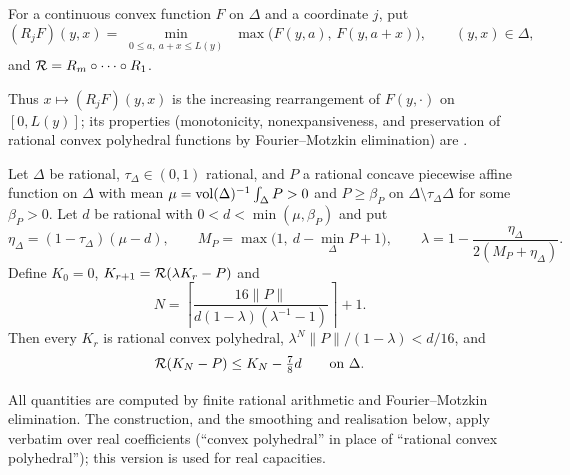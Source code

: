 \begin{definition}\label{def:cmp-rearrangement}
For a continuous convex function $F$ on $\Delta$ and a coordinate $j$, put
\[
 (R_jF)(y,x)=\min_{\substack{0\le a,\ a+x\le L(y)}}\ \max\bigl(F(y,a),\,F(y,a+x)\bigr),
 \qquad (y,x)\in\Delta,
\]
and $\mathcal{R}=R_m\circ\dots\circ R_1$.
\end{definition}

Thus $x\mapsto(R_jF)(y,x)$ is the increasing rearrangement of $F(y,\cdot)$ on $[0,L(y)]$; its properties
(monotonicity, nonexpansiveness, and preservation of rational convex polyhedral functions by Fourier--Motzkin
elimination) are .

\begin{proposition}\label{prop:cmp-fixed-point}
Let $\Delta$ be rational, $\tau_\Delta\in(0,1)$ rational, and $P$ a rational concave piecewise affine function on
$\Delta$ with mean $\mu=\operatorname{vol}(\Delta)^{-1}\int_\Delta P>0$ and $P\ge\beta_P$ on $\Delta\setminus\tau_\Delta\Delta$ for some
$\beta_P>0$. Let $d$ be rational with $0<d<\min(\mu,\beta_P)$ and put
\[
 \eta_\Delta=(1-\tau_\Delta)(\mu-d),\qquad M_P=\max\bigl(1,\ d-\min_\Delta P+1\bigr),\qquad
 \lambda=1-\frac{\eta_\Delta}{2(M_P+\eta_\Delta)}.
\]
Define $K_0=0$, $K_{r+1}=\mathcal{R}(\lambda K_r-P)$ and
\[
 N=\left\lceil\frac{16\|P\|}{d(1-\lambda)(\lambda^{-1}-1)}\right\rceil+1.
\]
Then every $K_r$ is rational convex polyhedral, $\lambda^N\|P\|/(1-\lambda)<d/16$, and
\[
 \mathcal{R}(K_N-P)\le K_N-\tfrac78d\qquad\text{on }\Delta .
\]
\end{proposition}

All quantities are computed by finite rational arithmetic and Fourier--Motzkin elimination. The construction, and the
smoothing and realisation below, apply verbatim over real coefficients (``convex polyhedral'' in place of ``rational
convex polyhedral''); this version is used for real capacities.

